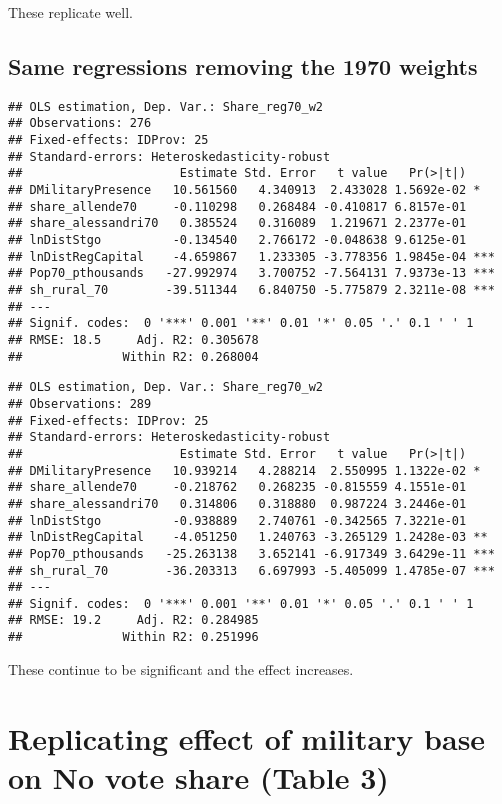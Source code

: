 \documentclass[
]{article}
\begin{document}
These replicate well.

\hypertarget{same-regressions-removing-the-1970-weights-1}{%
\subsection{Same regressions removing the 1970
weights}\label{same-regressions-removing-the-1970-weights-1}}

\begin{verbatim}
## OLS estimation, Dep. Var.: Share_reg70_w2
## Observations: 276 
## Fixed-effects: IDProv: 25
## Standard-errors: Heteroskedasticity-robust 
##                      Estimate Std. Error   t value   Pr(>|t|)    
## DMilitaryPresence   10.561560   4.340913  2.433028 1.5692e-02 *  
## share_allende70     -0.110298   0.268484 -0.410817 6.8157e-01    
## share_alessandri70   0.385524   0.316089  1.219671 2.2377e-01    
## lnDistStgo          -0.134540   2.766172 -0.048638 9.6125e-01    
## lnDistRegCapital    -4.659867   1.233305 -3.778356 1.9845e-04 ***
## Pop70_pthousands   -27.992974   3.700752 -7.564131 7.9373e-13 ***
## sh_rural_70        -39.511344   6.840750 -5.775879 2.3211e-08 ***
## ---
## Signif. codes:  0 '***' 0.001 '**' 0.01 '*' 0.05 '.' 0.1 ' ' 1
## RMSE: 18.5     Adj. R2: 0.305678
##              Within R2: 0.268004
\end{verbatim}

\begin{verbatim}
## OLS estimation, Dep. Var.: Share_reg70_w2
## Observations: 289 
## Fixed-effects: IDProv: 25
## Standard-errors: Heteroskedasticity-robust 
##                      Estimate Std. Error   t value   Pr(>|t|)    
## DMilitaryPresence   10.939214   4.288214  2.550995 1.1322e-02 *  
## share_allende70     -0.218762   0.268235 -0.815559 4.1551e-01    
## share_alessandri70   0.314806   0.318880  0.987224 3.2446e-01    
## lnDistStgo          -0.938889   2.740761 -0.342565 7.3221e-01    
## lnDistRegCapital    -4.051250   1.240763 -3.265129 1.2428e-03 ** 
## Pop70_pthousands   -25.263138   3.652141 -6.917349 3.6429e-11 ***
## sh_rural_70        -36.203313   6.697993 -5.405099 1.4785e-07 ***
## ---
## Signif. codes:  0 '***' 0.001 '**' 0.01 '*' 0.05 '.' 0.1 ' ' 1
## RMSE: 19.2     Adj. R2: 0.284985
##              Within R2: 0.251996
\end{verbatim}

These continue to be significant and the effect increases.

\hypertarget{replicating-effect-of-military-base-on-no-vote-share-table-3}{%
\section{Replicating effect of military base on No vote share (Table
3)}\label{replicating-effect-of-military-base-on-no-vote-share-table-3}}
\end{document}
